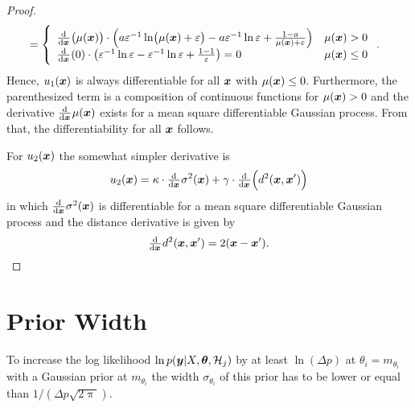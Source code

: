 \begin{proof}
\begin{align*}
        &= \left\{ \begin{array}{ll}
                \dx\!\del{\mu(\vc x)} \cdot \del{a\varepsilon^{-1} 
                    \ln\!\del{\mu(\vc x) + \varepsilon} - a\varepsilon^{-1} \ln 
                    \varepsilon + \frac{1 - a}{\mu(\vc{x}) + \varepsilon}} 
                & \mu(\vc x) > 0 \\
                \dx\!\del{0} \cdot \del{\varepsilon^{-1} \ln \varepsilon 
                    - \varepsilon^{-1} \ln \varepsilon + \frac{1 
                        - 1}{\varepsilon}} = 0 & \mu(\vc x) \leq 0
            \end{array} \right. \text{.}
        \end{align*}
    Hence, $u_1(\bm{x})$ is always differentiable for all $\bm{x}$ with $\mu(\bm{x}) \leq 0$. Furthermore, the parenthesized term is a composition of 
    continuous functions for $\mu(\bm{x}) > 0$ and the derivative $\dx \mu(\vc 
    x)$ exists for a mean square differentiable Gaussian process. From that, the 
    differentiability for all $\bm{x}$ follows.

    For $u_2(\bm{x})$ the somewhat simpler derivative is
    \begin{equation*}
        u_2(\vc x) = \kappa \cdot \dx \sigma^2(\vc x) + \gamma \cdot 
        \dx\!\del{d^2(\vc x, \vc x')}
    \end{equation*}
    in which $\dx \sigma^2(\vc x)$ is differentiable for a mean square 
    differentiable Gaussian process and the distance derivative is given by
    \begin{equation*}
        \dx d^2(\vc x, \vc x') = 2 (\vc x - \vc x') \text{.}
    \end{equation*}
    \end{proof}

\chapter{Prior Width}\label{sec:prior}
\begin{theorem}
    To increase the log likelihood $\ln p(\bm{y} | X, \bm{\theta}, \mathcal{H}_j)$ 
    by at least $\ln(\Delta p)$ at $\theta_i = m_{\theta_i}$ with a Gaussian 
    prior at $m_{\theta_i}$ the width $\sigma_{\theta_i}$ of this prior has to 
    be lower or equal than $1 / (\Delta p \sqrt{2\uppi})$.
\end{theorem}

